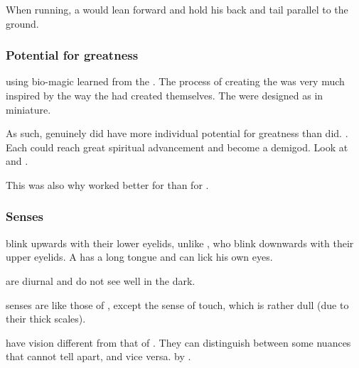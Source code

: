When running, a \scatha would lean forward and hold his back and tail parallel to the ground. 





\subsubsection{Potential for greatness}
 using bio-magic learned from the \xss.
The process of creating the \scathae was very much inspired by the way the \dragons had created themselves.
The \scathae were designed as \dragons in miniature.

As such, \scathae genuinely did have more individual potential for greatness than \humans did.
.
Each \scatha could reach great spiritual advancement and become a demigod.
Look at  and . 

This was also why  worked better for \scathae than for \humans. 





\subsubsection{Senses}

\Scathae{} blink upwards with their lower eyelids, unlike \humans, who blink downwards with their upper eyelids. 
A \scatha{} has a long tongue and can lick his own eyes. 

\Scathae{} are diurnal and do not see well in the dark. 

\Scathaese{} senses are like those of \humans, except the sense of touch, which is rather dull (due to their thick scales). 

\Scathae{} have \colour vision different from that of \humans. They can distinguish between some nuances that \humans{} cannot tell apart, and vice versa.  by .





